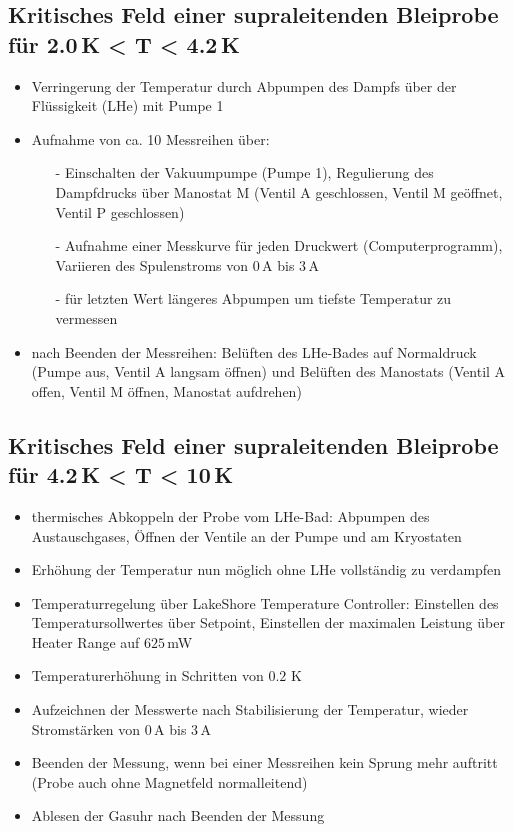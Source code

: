 \documentclass[german,  %
parskip=full,  %
]{scrartcl}
\begin{document}
\subsection{Kritisches Feld einer supraleitenden Bleiprobe für 2.0\,K < T < 4.2\,K}
\begin{itemize}
\item Verringerung der Temperatur durch Abpumpen des Dampfs über der Flüssigkeit (LHe) mit Pumpe 1
\item Aufnahme von ca. 10 Messreihen über:
\begin{itemize}
\item[-] Einschalten der Vakuumpumpe (Pumpe 1), Regulierung des Dampfdrucks über Manostat M (Ventil A geschlossen, Ventil M geöffnet, Ventil P geschlossen)
\item[-] Aufnahme einer Messkurve für jeden Druckwert (Computerprogramm), Variieren des Spulenstroms von $0$\,A bis $3$\,A
\item[-] für letzten Wert längeres Abpumpen um tiefste Temperatur zu vermessen
\end{itemize}
\item nach Beenden der Messreihen: Belüften des LHe-Bades auf Normaldruck (Pumpe aus, Ventil A langsam öffnen) und  Belüften des Manostats (Ventil A offen, Ventil M öffnen, Manostat aufdrehen)
\end{itemize}

\subsection{Kritisches Feld einer supraleitenden Bleiprobe für 4.2\,K < T < 10\,K}
\begin{itemize} 
\item thermisches Abkoppeln der Probe vom LHe-Bad: Abpumpen des Austauschgases, Öffnen der Ventile an der Pumpe und am Kryostaten
\item Erhöhung der Temperatur nun möglich ohne LHe vollständig zu verdampfen
\item Temperaturregelung über LakeShore Temperature Controller: Einstellen des Temperatursollwertes über Setpoint, Einstellen der maximalen Leistung über Heater Range auf $625$\,mW
\item Temperaturerhöhung in Schritten von $0.2$ K
\item Aufzeichnen der Messwerte nach Stabilisierung der Temperatur, wieder Stromstärken von $0$\,A bis $3$\,A
\item Beenden der Messung, wenn bei einer Messreihen kein Sprung mehr auftritt (Probe auch ohne Magnetfeld normalleitend)
\item Ablesen der Gasuhr nach Beenden der Messung
\end{itemize}
\end{document}

